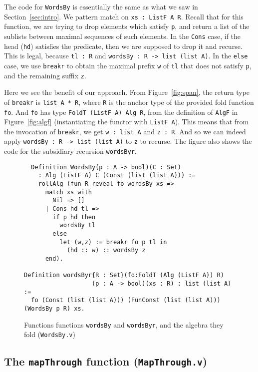\documentclass[a4paper,USenglish]{lipics-v2021}
\begin{document}
The code for \verb|WordsBy| is essentially
the same as what we saw in Section~\ref{sec:intro}.  We pattern match
on \verb|xs : ListF A R|.  Recall that for this function, we are
trying to drop elements which satisfy \verb|p|, and return a list of
the sublists between maximal sequences of such elements.  In the
\verb|Cons| case, if the head (\verb|hd|) satisfies the predicate, then we are
supposed to drop it and recurse.  This is legal, because \verb|tl : R|
and \verb|wordsBy : R -> list (list A)|.  In the \verb|else| case,
we use \verb|breakr| to obtain the maximal prefix \verb|w| of \verb|tl| that
does not satisfy \verb|p|, and the remaining suffix \verb|z|.

Here we see the benefit of our approach.  From Figure~\ref{fig:span},
the return type of \verb|breakr| is \verb|list A * R|, where \verb|R|
is the anchor type of the provided fold function \verb|fo|.  And
\verb|fo| has type \verb|FoldT (ListF A) Alg R|, from the definition
of \verb|AlgF| in Figure~\ref{fig:algf} (instantiating the functor
with \verb|ListF A|).  This means that from the invocation of
\verb|breakr|, we get \verb|w : list A| and \verb|z : R|.  And so we
can indeed apply \verb|wordsBy : R -> list (list A)| to
\verb|z| to recurse.  The figure also shows the code for the subsidiary
recursion \verb|wordsByr|.

\begin{figure}
\begin{verbatim}
  Definition WordsBy(p : A -> bool)(C : Set)
    : Alg (ListF A) C (Const (list (list A))) :=
    rollAlg (fun R reveal fo wordsBy xs => 
      match xs with
        Nil => [] 
      | Cons hd tl =>
        if p hd then
          wordsBy tl
        else
          let (w,z) := breakr fo p tl in
            (hd :: w) :: wordsBy z
      end).

Definition wordsByr{R : Set}(fo:FoldT (Alg (ListF A)) R)
                   (p : A -> bool)(xs : R) : list (list A) :=
  fo (Const (list (list A))) (FunConst (list (list A))) (WordsBy p R) xs.
\end{verbatim}
\caption{Functions functions \texttt{wordsBy} and \texttt{wordsByr}, and the algebra they
  fold (\texttt{WordsBy.v})}
\label{fig:wordsby}
\end{figure}

\subsection{The \texttt{mapThrough} function (\texttt{MapThrough.v})}
\end{document}
